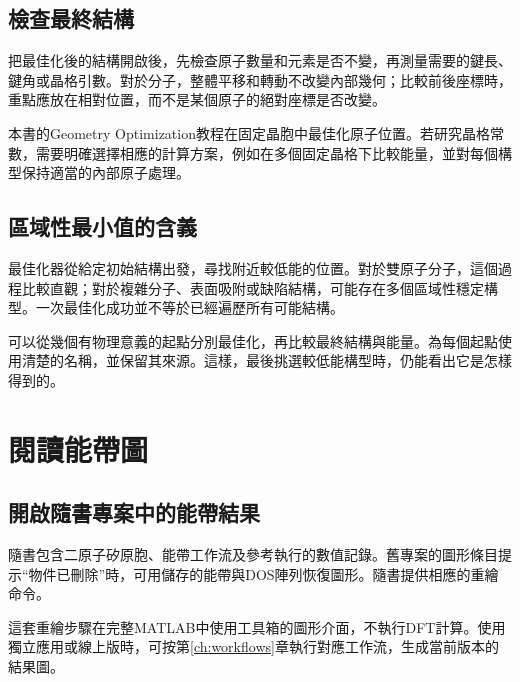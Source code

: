 \subsection{檢查最終結構}

把最佳化後的結構開啟後，先檢查原子數量和元素是否不變，再測量需要的鍵長、鍵角或晶格引數。對於分子，整體平移和轉動不改變內部幾何；比較前後座標時，重點應放在相對位置，而不是某個原子的絕對座標是否改變。

本書的Geometry Optimization教程在固定晶胞中最佳化原子位置。若研究晶格常數，需要明確選擇相應的計算方案，例如在多個固定晶格下比較能量，並對每個構型保持適當的內部原子處理。

\subsection{區域性最小值的含義}

最佳化器從給定初始結構出發，尋找附近較低能的位置。對於雙原子分子，這個過程比較直觀；對於複雜分子、表面吸附或缺陷結構，可能存在多個區域性穩定構型。一次最佳化成功並不等於已經遍歷所有可能結構。

可以從幾個有物理意義的起點分別最佳化，再比較最終結構與能量。為每個起點使用清楚的名稱，並保留其來源。這樣，最後挑選較低能構型時，仍能看出它是怎樣得到的。

\section{閱讀能帶圖}

\subsection{開啟隨書專案中的能帶結果}

隨書包含二原子矽原胞、能帶工作流及參考執行的數值記錄。舊專案的圖形條目提示“物件已刪除”時，可用儲存的能帶與DOS陣列恢復圖形。隨書提供相應的重繪命令。

這套重繪步驟在完整MATLAB\regmark{}中使用工具箱的圖形介面，不執行DFT計算。使用獨立應用或線上版時，可按第\ref{ch:workflows}章執行對應工作流，生成當前版本的結果圖。

